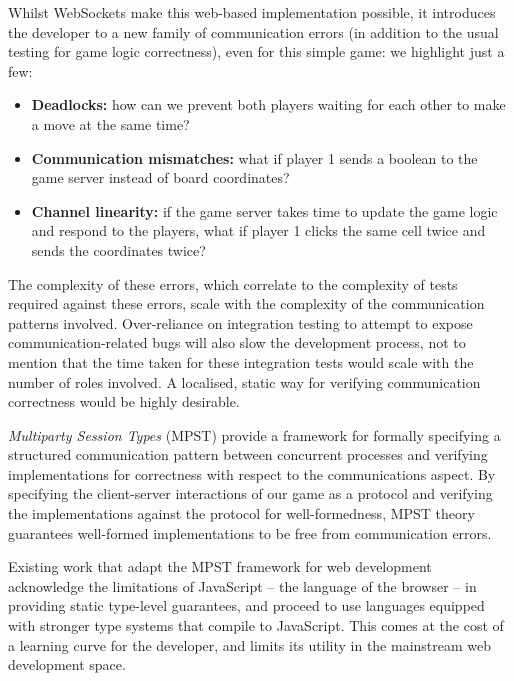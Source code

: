 Whilst WebSockets make this web-based implementation possible, 
it introduces the developer to a new family of communication errors
(in addition to the usual testing for game logic correctness), 
even for this simple game:
we highlight just a few:

\begin{itemize}

\item
\textbf{Deadlocks:} how can we prevent both players waiting for 
each other to make a move at the same time?

\item 
\textbf{Communication mismatches:} what if player 1 sends
a boolean to the game server instead of board coordinates?

\item
\textbf{Channel linearity:} if the game server takes time
to update the game logic and respond to the players, what if 
player 1 clicks the same cell twice and sends the coordinates twice?

\end{itemize}

The complexity of these errors, which correlate to the complexity of tests 
required against these errors, scale with the complexity of the 
communication patterns involved. Over-reliance on integration testing
to attempt to expose communication-related bugs will also slow the
development process, not to mention that the time taken for these
integration tests would scale with the number of roles involved.
A localised, static way for verifying communication correctness would
be highly desirable.

\textit{Multiparty Session Types} (MPST) \cite{MPST} provide 
a framework for formally specifying a structured communication pattern 
between concurrent processes and verifying implementations for 
correctness with respect to the communications aspect. 
By specifying the client-server interactions of our game as a protocol 
and verifying the implementations against the protocol for well-formedness, 
MPST theory guarantees well-formed implementations to be 
free from communication errors.

Existing work \cite{MVU2020,PureScript2019} that 
adapt the MPST framework for web development
acknowledge the limitations of JavaScript -- the language of the browser --
in providing static type-level guarantees, and proceed to use
languages equipped with stronger type systems that compile to JavaScript.
This comes at the cost of a learning curve for the developer,
and limits its utility in the mainstream web development space.


